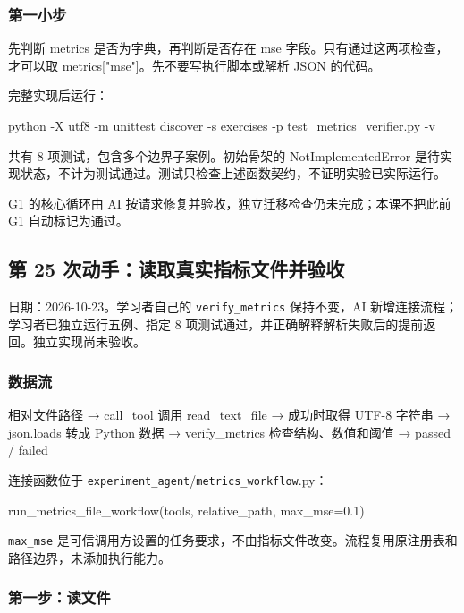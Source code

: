 \subsubsection{第一小步}

先判断 metrics 是否为字典，再判断是否存在 mse 字段。只有通过这两项检查，才可以取 metrics["mse"]。先不要写执行脚本或解析 JSON 的代码。

完整实现后运行：

\begin{Code}
python -X utf8 -m unittest discover -s exercises -p test_metrics_verifier.py -v
\end{Code}

共有 8 项测试，包含多个边界子案例。初始骨架的 NotImplementedError 是待实现状态，不计为测试通过。测试只检查上述函数契约，不证明实验已实际运行。

G1 的核心循环由 AI 按请求修复并验收，独立迁移检查仍未完成；本课不把此前 G1 自动标记为通过。

\subsection{第 25 次动手：读取真实指标文件并验收}

日期：2026-10-23。学习者自己的 \nolinkurl{verify_metrics} 保持不变，AI 新增连接流程；学习者已独立运行五例、指定 8 项测试通过，并正确解释解析失败后的提前返回。独立实现尚未验收。

\subsubsection{数据流}

\begin{Code}
相对文件路径
  → call_tool 调用 read_text_file
  → 成功时取得 UTF-8 字符串
  → json.loads 转成 Python 数据
  → verify_metrics 检查结构、数值和阈值
  → passed / failed
\end{Code}

连接函数位于 \nolinkurl{experiment_agent}/\nolinkurl{metrics_workflow}.py：

\begin{Code}
run_metrics_file_workflow(tools, relative_path, max_mse=0.1)
\end{Code}

\nolinkurl{max_mse} 是可信调用方设置的任务要求，不由指标文件改变。流程复用原注册表和路径边界，未添加执行能力。

\subsubsection{第一步：读文件}

